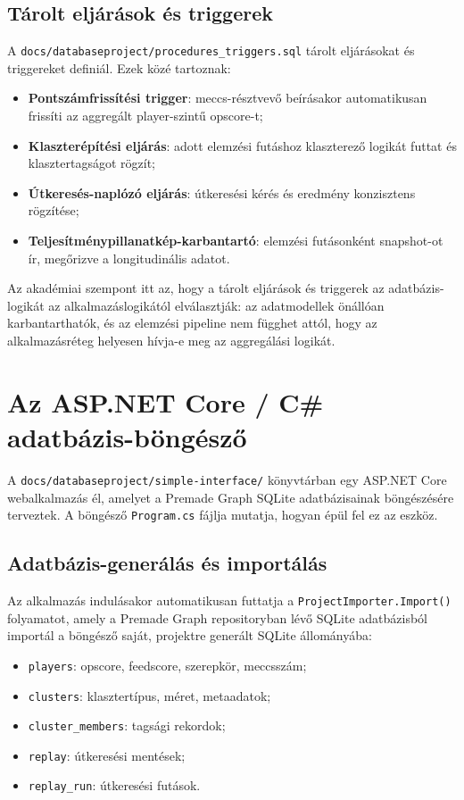 ﻿\documentclass[a4paper,12pt]{report}
\begin{document}
\subsection{Tárolt eljárások és triggerek}

A \texttt{docs/databaseproject/procedures\_triggers.sql} tárolt eljárásokat és triggereket definiál. Ezek közé tartoznak:
\begin{itemize}
    \item \textbf{Pontszámfrissítési trigger}: meccs-résztvevő beírásakor automatikusan frissíti az aggregált player-szintű opscore-t;
    \item \textbf{Klaszterépítési eljárás}: adott elemzési futáshoz klaszterező logikát futtat és klasztertagságot rögzít;
    \item \textbf{Útkeresés-naplózó eljárás}: útkeresési kérés és eredmény konzisztens rögzítése;
    \item \textbf{Teljesítménypillanatkép-karbantartó}: elemzési futásonként snapshot-ot ír, megőrizve a longitudinális adatot.
\end{itemize}

Az akadémiai szempont itt az, hogy a tárolt eljárások és triggerek az adatbázis-logikát az alkalmazáslogikától elválasztják: az adatmodellek önállóan karbantarthatók, és az elemzési pipeline nem függhet attól, hogy az alkalmazásréteg helyesen hívja-e meg az aggregálási logikát.

\section{Az ASP.NET Core / C\# adatbázis-böngésző}

A \texttt{docs/databaseproject/simple-interface/} könyvtárban egy ASP.NET Core webalkalmazás él, amelyet a Premade Graph SQLite adatbázisainak böngészésére terveztek. A böngésző \texttt{Program.cs} fájlja mutatja, hogyan épül fel ez az eszköz.

\subsection{Adatbázis-generálás és importálás}

Az alkalmazás indulásakor automatikusan futtatja a \texttt{ProjectImporter.Import()} folyamatot, amely a Premade Graph repositoryban lévő SQLite adatbázisból importál a böngésző saját, projektre generált SQLite állományába:

\begin{itemize}
    \item \texttt{players}: opscore, feedscore, szerepkör, meccsszám;
    \item \texttt{clusters}: klasztertípus, méret, metaadatok;
    \item \texttt{cluster\_members}: tagsági rekordok;
    \item \texttt{replay}: útkeresési mentések;
    \item \texttt{replay\_run}: útkeresési futások.
\end{itemize}
\end{document}
